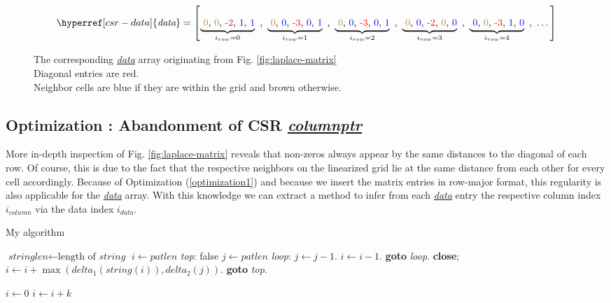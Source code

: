 \begin{figure*}
\centering
\[
	\hyperref[csr-data]{\textit{data}} = \left[ 
	\underbrace{\text{ \textcolor{brown}{0}, \textcolor{brown}{0}, \textcolor{red}{-2}, \textcolor{blue}{1}, \textcolor{blue}{1}}}_{i_{row} = 0} \text{ , }
	\underbrace{\text{ \textcolor{brown}{0}, \textcolor{blue}{0}, \textcolor{red}{-3}, \textcolor{blue}{0}, \textcolor{blue}{1}}}_{i_{row} = 1} \text{ , }
	\underbrace{\text{ \textcolor{brown}{0}, \textcolor{blue}{0}, \textcolor{red}{-3}, \textcolor{blue}{0}, \textcolor{blue}{1}}}_{i_{row} = 2} \text{ , }
	\underbrace{\text{ \textcolor{brown}{0}, \textcolor{blue}{0}, \textcolor{red}{-2}, \textcolor{brown}{0}, \textcolor{blue}{0}}}_{i_{row} = 3} \text{ , }
	\underbrace{\text{ \textcolor{blue}{0}, \textcolor{brown}{0}, \textcolor{red}{-3}, \textcolor{blue}{1}, \textcolor{blue}{0}}}_{i_{row} = 4} \text{ , }
	\dots
	\right]
\]
\caption{The corresponding \hyperref[csr-data]{\textit{data}} array originating from Fig. \ref{fig:laplace-matrix}\\
Diagonal entries are red.\\
Neighbor cells are blue if they are within the grid and brown otherwise.
}
\label{fig:data-columnptr-me1rge}
\end{figure*} 

\subsection{Optimization : Abandonment of CSR \hyperref[csr-columnptr]{\textit{columnptr}}}
More in-depth inspection of Fig. \ref{fig:laplace-matrix} reveals that non-zeros always appear by the same distances to the diagonal of each row. Of course, this is due to the fact that the respective neighbors on the linearized grid lie at the same distance from each other for every cell accordingly. Because of Optimization  (\ref{optimization1}) and because we insert the matrix entries in row-major format, this regularity is also applicable for the \hyperref[csr-data]{\textit{data}} array. With this knowledge we can extract a method to infer from each \hyperref[csr-data]{\textit{data}} entry the respective column index $i_{column}$ via the data index $i_{data}$.
\par 

\newpage
\begin{algorithm}
\caption{My algorithm}\label{euclid}
\begin{algorithmic}[1]
\State $\textit{stringlen} \gets \text{length of }\textit{string}$
\State $i \gets \textit{patlen}$
\BState \emph{top}:
 \Return false
\EndIf
\State $j \gets \textit{patlen}$
\BState \emph{loop}:
\State $j \gets j-1$.
\State $i \gets i-1$.
\State \textbf{goto} \emph{loop}.
\State \textbf{close};
\EndIf
\State $i \gets i+\max(\textit{delta}_1(\textit{string}(i)),\textit{delta}_2(j))$.
\State \textbf{goto} \emph{top}.
\EndProcedure
\end{algorithmic}
\end{algorithm}

\begin{algorithmic}
    \State $i\gets 0$
\Else
        \State $i\gets i+k$
    \EndIf
\EndIf
\end{algorithmic}